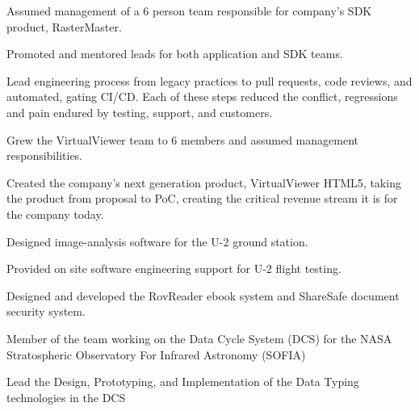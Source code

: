 \documentclass[letterpaper,10pt]{article}
\begin{document}
  \begin{resume_list}
    \item Assumed management of a 6 person team responsible for company's SDK product, RasterMaster.
    \item Promoted and mentored leads for both application and SDK teams.
    \item Lead engineering process from legacy practices to pull requests, code reviews, and automated, gating CI/CD. Each of these steps reduced the conflict, regressions and pain endured by testing, support, and customers.
  \end{resume_list}

     
  \begin{resume_list}
    \item Grew the VirtualViewer team to 6 members and assumed management responsibilities.
  \end{resume_list}

  \begin{resume_list}
      \item Created the company's next generation product, VirtualViewer HTML5, taking the product from proposal to PoC, creating the critical revenue stream it is for the company today.
  \end{resume_list}

  \begin{resume_list}
    \item Designed image-analysis software for the U-2 ground station.
    \item Provided on site software engineering support for U-2 flight testing.
  \end{resume_list}
  
  \begin{resume_list}
      \item Designed and developed the RovReader ebook system and ShareSafe document security system.
  \end{resume_list}
  
  \begin{resume_list}
    \item Member of the team working on the Data Cycle System (DCS) for the NASA Stratospheric Observatory For Infrared Astronomy (SOFIA)
    \item Lead the Design, Prototyping, and Implementation of the Data Typing technologies in the DCS 
  \end{resume_list}
\end{document}
